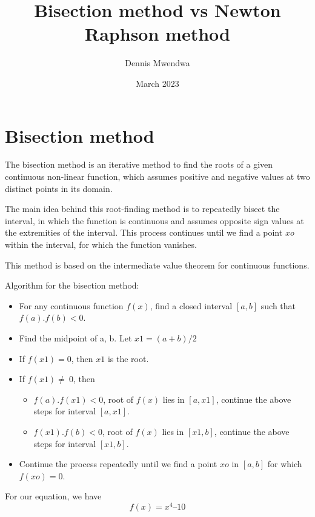 \documentclass{article}
\title{Bisection method vs Newton Raphson method}
\author{Dennis Mwendwa}
\date{March 2023}
\begin{document}
\maketitle

\section{Bisection method}
The bisection method is an iterative method to find the roots of a given continuous non-linear function, which assumes positive and negative values at two distinct points in its domain.

The main idea behind this root-finding method is to repeatedly bisect the interval, in which the function is continuous and assumes opposite sign values at the extremities of the interval. This process continues until we find a point $xo$ within the interval, for which the function vanishes.

This method is based on the intermediate value theorem for continuous functions.

Algorithm for the bisection method:

\begin{itemize}
        \item For any continuous function $f(x)$, find a closed interval $[a, b]$ such that $f(a).f(b) < 0$.
        \item Find the midpoint of a, b. Let $x1 = (a + b)/2$

        \item If $f(x1) = 0$, then $x1$ is the root.
        \item If $f(x1) \neq\  0$, then
        
           \begin{itemize}
              \item $f(a).f(x1) < 0$, root of $f(x)$ lies in $[a, x1]$, continue the above steps for interval $[a, x1]$.
              \item $f(x1).f(b) < 0$, root of $f(x)$ lies in $[x1, b]$, continue the above steps        for interval $[x1, b]$.
          \end{itemize}
        \item Continue the process repeatedly until we find a point $xo$ in $[a, b]$ for which $f(xo) = 0$.
\end{itemize}



For our equation, we have $$f(x)= x^4 – 10$$
 
\pagebreak
\end{document}
